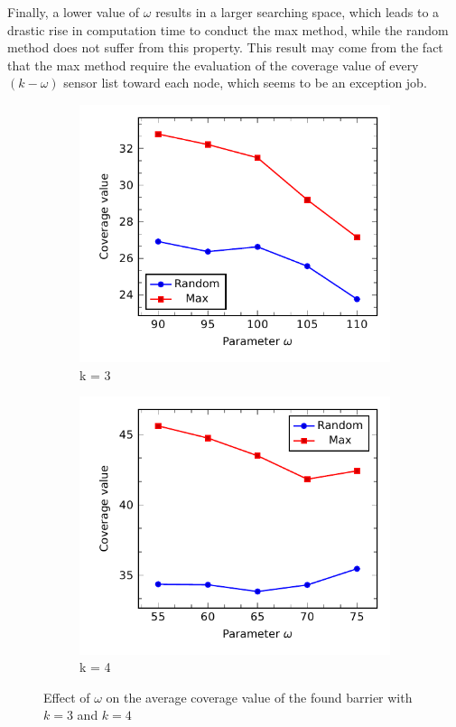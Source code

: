 Finally, a lower value of $\omega$ results in a larger searching space, which leads to a drastic rise in computation time to conduct the max method, while the random method does not suffer from this property. This result may come from the fact that the max method require the evaluation of the coverage value of every $(k-\omega)$ sensor list toward each node, which seems to be an exception job.

\begin{figure}[!h]
	\begin{subfigure}[t]{.5\textwidth}
		\centering
		\includegraphics[scale=.8]{Hinhanh/OmegaEffect/coverage/k3.pdf}
		\caption{k = 3}
	\end{subfigure}
	\begin{subfigure}[t]{.5\textwidth}
		\centering
		\includegraphics[scale=.8]{Hinhanh/OmegaEffect/coverage/k4.pdf}		
		\caption{k = 4}
	\end{subfigure}
\caption{Effect of $\omega$ on the average coverage value of the found barrier with $k = 3$ and $k = 4$}
\label{fig:wv}
\end{figure}
